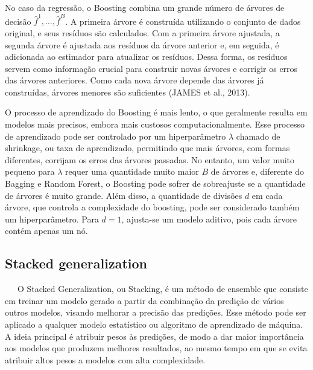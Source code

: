 \documentclass[
  12pt,
  a4paper,
]{scrreprt}
\begin{document}
\vspace{12pt}

No caso da regressão, o Boosting combina um grande número de árvores de
decisão \(\hat{f}^1, \dots, \hat{f}^B\). A primeira árvore é construída
utilizando o conjunto de dados original, e seus resíduos são calculados.
Com a primeira árvore ajustada, a segunda árvore é ajustada aos resíduos
da árvore anterior e, em seguida, é adicionada ao estimador para
atualizar os resíduos. Dessa forma, os resíduos servem como informação
crucial para construir novas árvores e corrigir os erros das árvores
anteriores. Como cada nova árvore depende das árvores já construídas,
árvores menores são suficientes (JAMES et al., 2013).

\vspace{12pt}

O processo de aprendizado do Boosting é mais lento, o que geralmente
resulta em modelos mais precisos, embora mais custosos
computacionalmente. Esse processo de aprendizado pode ser controlado por
um hiperparâmetro \(\lambda\) chamado de shrinkage, ou taxa de
aprendizado, permitindo que mais árvores, com formas diferentes,
corrijam os erros das árvores passadas. No entanto, um valor muito
pequeno para \(\lambda\) requer uma quantidade muito maior \(B\) de
árvores e, diferente do Bagging e Random Forest, o Boosting pode sofrer
de sobreajuste se a quantidade de árvores é muito grande. Além disso, a
quantidade de divisões \(d\) em cada árvore, que controla a complexidade
do boosting, pode ser considerado também um hiperparâmetro. Para
\(d = 1\), ajusta-se um modelo aditivo, pois cada árvore contém apenas
um nó.

\subsection{Stacked generalization}\label{stacked-generalization}

~~~O Stacked Generalization, ou Stacking, é um método de ensemble que
consiste em treinar um modelo gerado a partir da combinação da predição
de vários outros modelos, visando melhorar a precisão das predições.
Esse método pode ser aplicado a qualquer modelo estatístico ou algoritmo
de aprendizado de máquina. A ideia principal é atribuir pesos às
predições, de modo a dar maior importância aos modelos que produzem
melhores resultados, ao mesmo tempo em que se evita atribuir altos pesos
a modelos com alta complexidade.

\vspace{12pt}
\end{document}
